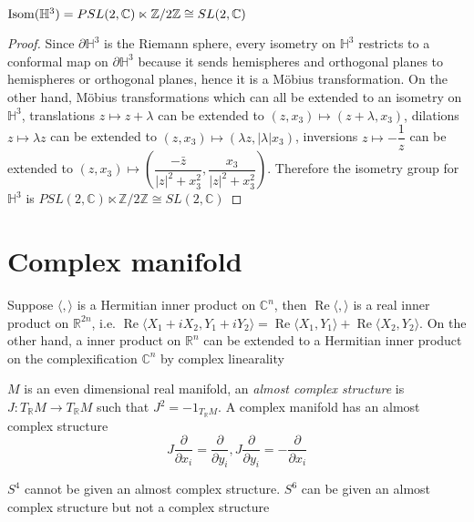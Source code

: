 \documentclass[main]{subfiles}
\begin{document}
\begin{theorem}
$\operatorname{Isom}(\mathbb H^3)=PSL(2,\mathbb C)\ltimes\mathbb Z/2\mathbb Z\cong SL(2,\mathbb C)$
\end{theorem}

\begin{proof}
Since $\partial\mathbb H^3$ is the Riemann sphere, every isometry on $\mathbb H^3$ restricts to a conformal map on $\partial\mathbb H^3$ because it sends hemispheres and orthogonal planes to hemispheres or orthogonal planes, hence it is a M\"obius transformation. On the other hand, M\"obius transformations which can all be extended to an isometry on $\mathbb H^3$, translations $z\mapsto z+\lambda$ can be extended to $(z,x_3)\mapsto(z+\lambda,x_3)$, dilations $z\mapsto\lambda z$ can be extended to $(z,x_3)\mapsto (\lambda z,|\lambda|x_3)$, inversions $z\mapsto -\dfrac{1}{z}$ can be extended to $(z,x_3)\mapsto\left(\dfrac{-\bar z}{|z|^2+x_3^2},\dfrac{x_3}{|z|^2+x_3^2}\right)$. Therefore the isometry group for $\mathbb H^3$ is $PSL(2,\mathbb C)\ltimes\mathbb Z/2\mathbb Z\cong SL(2,\mathbb C)$
\end{proof}



\section{Complex manifold}

Suppose $\langle,\rangle$ is a Hermitian inner product on $\mathbb C^n$, then $\operatorname{Re}\langle,\rangle$ is a real inner product on $\mathbb R^{2n}$, i.e. $\operatorname{Re}\langle X_1+iX_2,Y_1+iY_2\rangle=\operatorname{Re}\langle X_1,Y_1\rangle+\operatorname{Re}\langle X_2,Y_2\rangle$. On the other hand, a inner product on $\mathbb R^n$ can be extended to a Hermitian inner product on the complexification $\mathbb C^n$ by complex linearality

\begin{definition}
$M$ is an even dimensional real manifold, an \textit{almost complex structure} is $J:T_{\mathbb R}M\to T_{\mathbb R}M$ such that $J^2=-1_{T_{\mathbb R}M}$. A complex manifold has an almost complex structure
\[J\dfrac{\partial}{\partial x_i}=\dfrac{\partial}{\partial y_i}, J\dfrac{\partial}{\partial y_i}=-\dfrac{\partial}{\partial x_i}\]
\end{definition}

\begin{example}
$S^4$ cannot be given an almost complex structure. $S^6$ can be given an almost complex structure but not a complex structure
\end{example}
\end{document}
